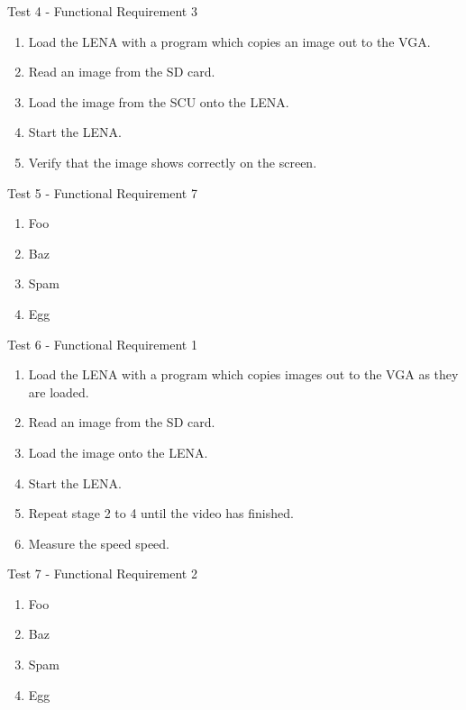 {\sc Test 4 - Functional Requirement 3}

{\em \FRIII}

\begin{enumerate}
\item Load the \ac{LENA} with a program which copies an image out to the
  \ac{VGA}.
\item Read an image from the \ac{SD} card.
\item Load the image from the \ac{SCU} onto the \ac{LENA}.
\item Start the \ac{LENA}.
\item Verify that the image shows correctly on the screen.
\end{enumerate}

{\sc Test 5 - Functional Requirement 7}

{\em \FRVII}

\begin{enumerate}
\item Foo
\item Baz
\item Spam
\item Egg
\end{enumerate}

{\sc Test 6 - Functional Requirement 1}

{\em \FRI}

\begin{enumerate}
\item Load the \ac{LENA} with a program which copies images out to the \ac{VGA}
  as they are loaded.
\item Read an image from the \ac{SD} card.
\item Load the image onto the \ac{LENA}.
\item Start the \ac{LENA}.
\item Repeat stage 2 to 4 until the video has finished.
\item Measure the speed speed.
\end{enumerate}

{\sc Test 7 - Functional Requirement 2}

{\em \FRII}

\begin{enumerate}
\item Foo
\item Baz
\item Spam
\item Egg
\end{enumerate}
